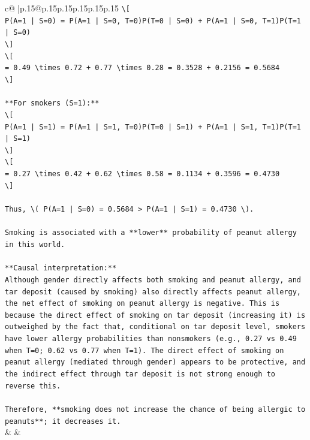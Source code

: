 \documentclass{article}
\begin{document}
{\begin{supertabular}{c@{$\;$}|p{.15\linewidth}@{}p{.15\linewidth}p{.15\linewidth}p{.15\linewidth}p{.15\linewidth}p{.15\linewidth}}
{{{\texttt{\textbackslash{}{[}} \\
\texttt{P(A=1 | S=0) = P(A=1 | S=0, T=0)P(T=0 | S=0) + P(A=1 | S=0, T=1)P(T=1 | S=0)} \\
\texttt{\textbackslash{}{]}} \\
\texttt{\textbackslash{}{[}} \\
\texttt{= 0.49 \textbackslash{}times 0.72 + 0.77 \textbackslash{}times 0.28 = 0.3528 + 0.2156 = 0.5684} \\
\texttt{\textbackslash{}{]}} \\
\\ 
\texttt{**For smokers (S=1):**} \\
\texttt{\textbackslash{}{[}} \\
\texttt{P(A=1 | S=1) = P(A=1 | S=1, T=0)P(T=0 | S=1) + P(A=1 | S=1, T=1)P(T=1 | S=1)} \\
\texttt{\textbackslash{}{]}} \\
\texttt{\textbackslash{}{[}} \\
\texttt{= 0.27 \textbackslash{}times 0.42 + 0.62 \textbackslash{}times 0.58 = 0.1134 + 0.3596 = 0.4730} \\
\texttt{\textbackslash{}{]}} \\
\\ 
\texttt{Thus, \textbackslash{}( P(A=1 | S=0) = 0.5684 > P(A=1 | S=1) = 0.4730 \textbackslash{}).} \\
\\ 
\texttt{Smoking is associated with a **lower** probability of peanut allergy in this world.} \\
\\ 
\texttt{**Causal interpretation:**  } \\
\texttt{Although gender directly affects both smoking and peanut allergy, and tar deposit (caused by smoking) also directly affects peanut allergy, the net effect of smoking on peanut allergy is negative. This is because the direct effect of smoking on tar deposit (increasing it) is outweighed by the fact that, conditional on tar deposit level, smokers have lower allergy probabilities than nonsmokers (e.g., 0.27 vs 0.49 when T=0; 0.62 vs 0.77 when T=1). The direct effect of smoking on peanut allergy (mediated through gender) appears to be protective, and the indirect effect through tar deposit is not strong enough to reverse this.} \\
\\ 
\texttt{Therefore, **smoking does not increase the chance of being allergic to peanuts**; it decreases it.} \\
            }
        }
    }
    & & \\ \\


\end{supertabular}}
\end{document}
